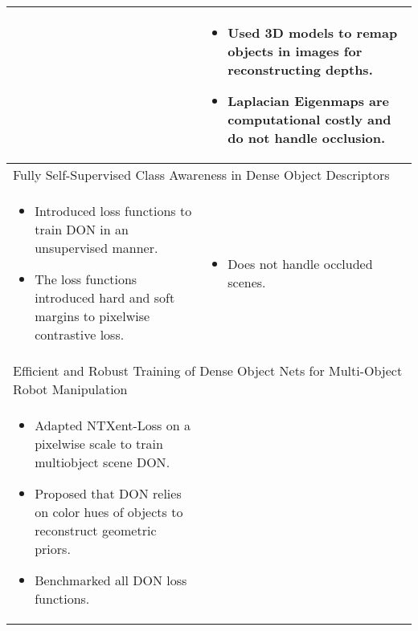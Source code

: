 \begin{longtable}{|p{7cm}|p{7cm}|}
\begin{itemize}
    \end{itemize} & \begin{itemize}
                        \itemsep0em
                        \item Used 3D models to remap objects in images for reconstructing depths.
                        \item Laplacian Eigenmaps are computational costly and do not handle occlusion.
                    \end{itemize}                                                     \\ \hline
    \multicolumn{2}{m{14cm}}{\centering Fully Self-Supervised Class Awareness in Dense Object Descriptors\cite{hadjivelichkov2021fully}  }                                                                                      \\ \hline
    \begin{itemize}
        \itemsep0em
        \item Introduced loss functions to train \ac{DON} in an unsupervised manner.
        \item The loss functions introduced hard and soft margins to pixelwise contrastive loss.
    \end{itemize}                                                                                 & \begin{itemize}
                                                                                                        \item Does not handle occluded scenes.
                                                                                                    \end{itemize}                                                                                       \\ \hline
    \multicolumn{2}{m{14cm}}{\centering Efficient and Robust Training of Dense Object Nets for Multi-Object Robot Manipulation\cite{adrian2022efficient}  }                                                                     \\ \hline
    \begin{itemize}
        \itemsep0em
        \item Adapted NTXent-Loss on a pixelwise scale to train multiobject scene \ac{DON}.
        \item Proposed that \ac{DON} relies on color hues of objects to reconstruct geometric priors.
        \item Benchmarked all \ac{DON} loss functions.

\end{itemize}
\end{longtable}
